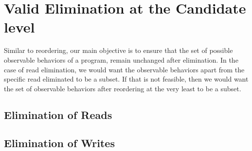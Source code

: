 \section{Valid Elimination at the Candidate level}


    Similar to reordering, our main objective is to ensure that the set of possible observable behaviors of a program, remain unchanged after elimination. 
    In the case of read elimination, we would want the observable behaviors apart from the specific read eliminated to be a subset.
    If that is not feasible, then we would want the set of observable behaviors after reordering at the very least to be a subset.


    \subsection{Elimination of Reads}
        

    \subsection{Elimination of Writes}
        
    